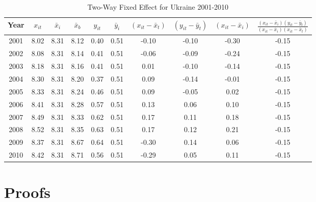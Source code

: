 \documentclass{article}[12pt]
\begin{document}
\begin{table}[ht]
\centering

\begin{tabular}{cccccccccc}

 Year & $x_{it}$ & $\bar{x}_i$ & $\bar{x}_b$ & $y_{it}$ & $\bar{y}_i$ &  $(x_{it}  - \bar{x}_t)$ & $(y_{it} - \bar{y}_t)$ & $(x_{it}  - \bar{x}_i)$ & $\frac{(x_{it}  - \bar{x}_i)(y_{it} - \bar{y}_t)}{(x_{it}  - \bar{x}_i)(x_{it} - \bar{x}_t)}$ \\
\midrule
 2001 & 8.02 & 8.31 & 8.12 & 0.40 & 0.51 & -0.10 & -0.10 & -0.30 & -0.15 \\ 2002 & 8.08 & 8.31 & 8.14 & 0.41 & 0.51 & -0.06 & -0.09 & -0.24 & -0.15 \\ 2003 & 8.18 & 8.31 & 8.16 & 0.41 & 0.51 & 0.01 & -0.10 & -0.14 & -0.15 \\ 2004 & 8.30 & 8.31 & 8.20 & 0.37 & 0.51 & 0.09 & -0.14 & -0.01 & -0.15 \\ 2005 & 8.33 & 8.31 & 8.24 & 0.46 & 0.51 & 0.09 & -0.05 & 0.02 & -0.15 \\ 2006 & 8.41 & 8.31 & 8.28 & 0.57 & 0.51 & 0.13 & 0.06 & 0.10 & -0.15 \\ 2007 & 8.49 & 8.31 & 8.33 & 0.62 & 0.51 & 0.17 & 0.11 & 0.18 & -0.15 \\ 2008 & 8.52 & 8.31 & 8.35 & 0.63 & 0.51 & 0.17 & 0.12 & 0.21 & -0.15 \\ 2009 & 8.37 & 8.31 & 8.67 & 0.64 & 0.51 & -0.30 & 0.14 & 0.06 & -0.15 \\ 2010 & 8.42 & 8.31 & 8.71 & 0.56 & 0.51 & -0.29 & 0.05 & 0.11 & -0.15 \\

\end{tabular}
\caption{Two-Way Fixed Effect for Ukraine 2001-2010}\label{Ukraine_table}
\end{table}
	


\section{Proofs}
\end{document}

